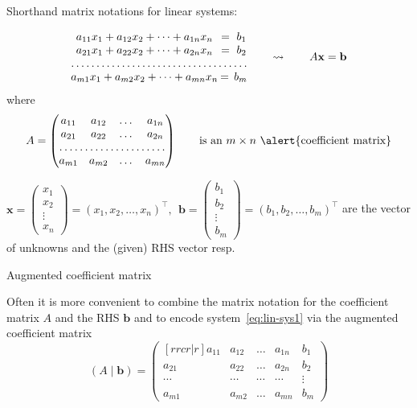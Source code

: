 \documentclass%
[handout]%
{beamer}
\newcommand{\bb}{{\mathbf b}}
\newcommand{\bx}{{\mathbf x}}
\begin{document}
\begin{frame}[label=matrix-formulation]{Shorthand matrix notations for linear systems:}

\begin{equation}\label{eq:lin-sys1} \begin{matrix}
    a_{11} {x_1} + a_{12} {x_2} + \cdots + a_{1n}  {x_n} \hspace{-8pt}&= \ b_1\\
    a_{21} {x_1} + a_{22} {x_2} + \cdots + a_{2n}  {x_n} \hspace{-8pt}&= \ b_2\\
    \hdotsfor{2} \\
    a_{m1} {x_1} + a_{m2} {x_2} + \cdots + a_{mn}  {x_n} \hspace{-8pt}&= \,b_m
   \end{matrix}
   \qquad \rightsquigarrow \qquad
   A\bx = \bb
\end{equation}
where
\[
    A = \begin{pmatrix}
      a_{11} & a_{12} & \dots & a_{1n} \\
      a_{21} & a_{22} & \dots & a_{2n}  \\
      \hdotsfor{4} \\
      a_{m1} & a_{m2} & \dots & a_{mn}
    \end{pmatrix}
    \qquad \text{is an $m\times n$ \alert{coefficient matrix}}
\]

\( \bx =
    \left( \!\!\begin{array}{c}
      x_1\\x_2\\ \vdots \\ x_n
    \end{array}\!\!\right) = (x_1, x_2, \dots, x_n)^\top,
    \ \ \bb =
    \left(\!\!\begin{array}{c}
      b_1\\b_2\\ \vdots \\ b_m
    \end{array}\!\!\right) = (b_1, b_2, \dots, b_m)^\top
\)
are the \alert{vector of unknowns} and the (given) \alert{RHS} vector resp.
\end{frame}


\begin{frame}[label=augmented-matrix]{Augmented coefficient matrix}
  \begin{block}{}
  Often it is more convenient to combine the matrix notation for the coefficient matrix $A$ and the RHS $\bb$ and to encode system~\eqref{eq:lin-sys1} via the \alert{augmented coefficient matrix}
  \[
    (A\mid\bb) = \begin{pmatrix}[rrcr|r]
      a_{11} & a_{12} & \dots & a_{1n} & b_1 \\
      a_{21} & a_{22} & \dots & a_{2n} & b_2 \\
      \cdots & \cdots & \cdots & \cdots & \vdots   \\
      a_{m1} & a_{m2} & \dots & a_{mn} & b_m
    \end{pmatrix}
  \]
  \end{block}
\end{frame}
\end{document}
